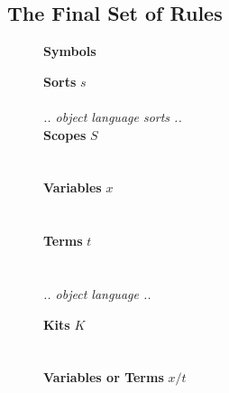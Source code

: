 \documentclass[screen,nonacm]{acmart}
\begin{document}
\subsection{The Final Set of Rules}\label{sec:ags-rls}
\begin{figure}[t]
      \centering
      \small
      {\raggedright \textbf{\Large Symbols} \par}
      \vspace{1.5em}

      \begin{minipage}[t]{0.48\textwidth}
            \raggedright{}
            \textbf{Sorts} $s$ \\
            \ESortTy{}\\
            \vspace{0.5em}
            \emph{.. object language sorts ..}\\
            \vspace{0.5em}
            \textbf{Scopes} $S$ \\
            \EScopeDefTy{}\\
            \vspace{0.5em}
            \EScopeDef{}\\
            \vspace{0.5em}
            \textbf{Variables} $x$ \\
            \EVarsTy{}\\
            \vspace{0.5em}
            \EVars{}\\
            \vspace{0.5em}
            \textbf{Terms} $t$ \\
            \ETmC{}\\
            \vspace{0.5em}
            \EVarC{}\\
            \emph{.. object language  ..}\\
            \vspace{1.0em}
      \end{minipage}
      \hfill
      \begin{minipage}[t]{0.48\textwidth}
            \raggedright{}
            \textbf{Kits} $K$ \\
            \EKitDefTy{}\\
            \vspace{0.5em}
            \EKitDef{}\\
            \vspace{0.5em}
            \textbf{Variables or Terms} $x/t$\\

\end{minipage}
\end{figure}
\end{document}
